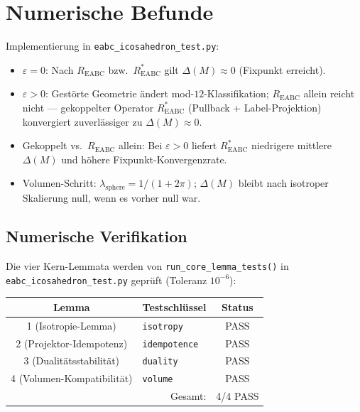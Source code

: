 \documentclass[11pt,a4paper]{article}
\begin{document}
	\section{Numerische Befunde}
	
	Implementierung in \texttt{eabc\_icosahedron\_test.py}:
	
	\begin{itemize}
		\item $\varepsilon=0$: Nach $R_{\mathrm{EABC}}$ bzw.\ $R^*_{\mathrm{EABC}}$
		gilt $\Delta(M)\approx 0$ (Fixpunkt erreicht).
		\item $\varepsilon>0$: Gestörte Geometrie ändert mod-$12$-Klassifikation;
		$R_{\mathrm{EABC}}$ allein reicht nicht --- gekoppelter Operator $R^*_{\mathrm{EABC}}$
		(Pullback + Label-Projektion) konvergiert zuverlässiger zu $\Delta(M)\approx 0$.
		\item Gekoppelt vs.\ $R_{\mathrm{EABC}}$ allein: Bei $\varepsilon>0$ liefert
		$R^*_{\mathrm{EABC}}$ niedrigere mittlere $\Delta(M)$ und höhere Fixpunkt-Konvergenzrate.
		\item Volumen-Schritt: $\lambda_{\mathrm{sphere}}=1/(1+2\pi)$; $\Delta(M)$ bleibt
		nach isotroper Skalierung null, wenn es vorher null war.
	\end{itemize}
	
	\subsection{Numerische Verifikation}
	
	Die vier Kern-Lemmata werden von \texttt{run\_core\_lemma\_tests()} in
	\texttt{eabc\_icosahedron\_test.py} geprüft (Toleranz $10^{-6}$):
	
	\begin{center}
		\begin{tabular}{clc}
			\hline
			Lemma & Testschlüssel & Status \\
			\hline
			1 (Isotropie-Lemma)        & \texttt{isotropy}     & PASS \\
			2 (Projektor-Idempotenz)   & \texttt{idempotence}  & PASS \\
			3 (Dualitätsstabilität)    & \texttt{duality}      & PASS \\
			4 (Volumen-Kompatibilität) & \texttt{volume}       & PASS \\
			\hline
			\multicolumn{2}{r}{Gesamt:} & 4/4 PASS \\
		\end{tabular}
	\end{center}
	
\end{document}
